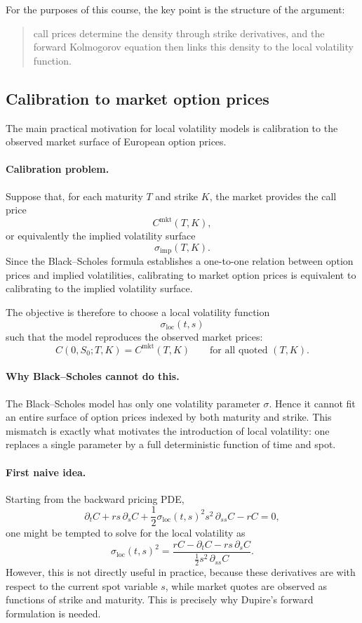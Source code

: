 \documentclass[11pt]{article}
\theoremstyle{plain}
\theoremstyle{definition}
\theoremstyle{remark}
\begin{document}
For the purposes of this course, the key point is the structure of the
argument:
\begin{quote}
call prices determine the density through strike derivatives, and the
forward Kolmogorov equation then links this density to the local
volatility function.
\end{quote}

\subsection{Calibration to market option prices}

The main practical motivation for local volatility models is calibration
to the observed market surface of European option prices.

\paragraph{Calibration problem.}
Suppose that, for each maturity \(T\) and strike \(K\), the market
provides the call price
\[
C^{\mathrm{mkt}}(T,K),
\]
or equivalently the implied volatility surface
\[
\sigma_{\mathrm{imp}}(T,K).
\]
Since the Black--Scholes formula establishes a one-to-one relation
between option prices and implied volatilities, calibrating to market
option prices is equivalent to calibrating to the implied volatility
surface.  

The objective is therefore to choose a local volatility function
\[
\sigma_{\mathrm{loc}}(t,s)
\]
such that the model reproduces the observed market prices:
\[
C(0,S_0;T,K)=C^{\mathrm{mkt}}(T,K)
\qquad\text{for all quoted }(T,K).
\]

\paragraph{Why Black--Scholes cannot do this.}
The Black--Scholes model has only one volatility parameter \(\sigma\).
Hence it cannot fit an entire surface of option prices indexed by both
maturity and strike.
This mismatch is exactly what motivates the introduction of local
volatility: one replaces a single parameter by a full deterministic
function of time and spot.  

\paragraph{First naive idea.}
Starting from the backward pricing PDE,
\[
\partial_t C
+
rs\,\partial_s C
+
\frac12 \sigma_{\mathrm{loc}}(t,s)^2 s^2\,\partial_{ss}C
-rC=0,
\]
one might be tempted to solve for the local volatility as
\[
\sigma_{\mathrm{loc}}(t,s)^2
=
\frac{
rC-\partial_t C-rs\,\partial_s C
}{
\frac12 s^2\,\partial_{ss}C
}.
\]
However, this is not directly useful in practice, because these
derivatives are with respect to the current spot variable \(s\), while
market quotes are observed as functions of strike and maturity. This is
precisely why Dupire's forward formulation is needed.  
\end{document}

